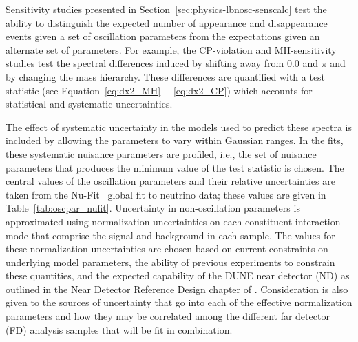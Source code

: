 Sensitivity studies presented in Section~\ref{sec:physics-lbnosc-senscalc} test the ability to distinguish
the expected number of \nue appearance and \numu disappearance events given a set of oscillation parameters
from the expectations given an alternate set of parameters. For example, the CP-violation and 
MH-sensitivity
studies test the spectral differences induced by shifting \deltacp away from 0.0 and $\pi$ and by changing the
mass hierarchy. These differences are quantified with a test statistic (see Equation~\ref{eq:dx2_MH}~-~\ref{eq:dx2_CP}) 
which accounts for statistical and systematic uncertainties. 

The effect of systematic uncertainty in the models used to 
predict these spectra is included by allowing the parameters to vary within Gaussian ranges. In the fits,
these systematic nuisance parameters are profiled, i.e., the set of nuisance parameters that produces the
minimum value of the test statistic is chosen.  The central values of the oscillation
parameters and their relative uncertainties are taken from the Nu-Fit~\cite{Gonzalez-Garcia:2014bfa} global
fit to neutrino data; these values are given in Table~\ref{tab:oscpar_nufit}. Uncertainty in non-oscillation
parameters is approximated using
normalization uncertainties on each constituent interaction mode that comprise the signal and background
in each sample. The values for these normalization uncertainties are chosen based on current constraints
on underlying model parameters, the ability of previous experiments to constrain these quantities,
and the expected capability of the DUNE near detector (ND) as outlined in the Near Detector Reference Design chapter of \voldune. %
Consideration is also given to the sources of uncertainty that go into each of the effective normalization
parameters and how they
may be correlated among the different far detector (FD) analysis samples that will be fit in combination.



